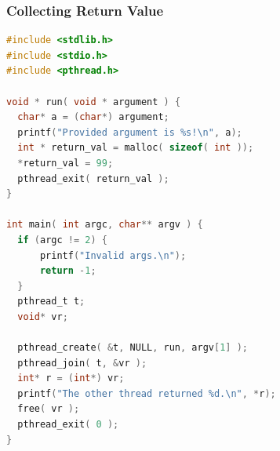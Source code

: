 \begin{frame}[fragile]
	\frametitle{Collecting Return Value}

	\begin{lstlisting}[language=C]
#include <stdlib.h>
#include <stdio.h>
#include <pthread.h>

void * run( void * argument ) { 
  char* a = (char*) argument;
  printf("Provided argument is %s!\n", a); 
  int * return_val = malloc( sizeof( int )); 
  *return_val = 99; 
  pthread_exit( return_val );
}

int main( int argc, char** argv ) { 
  if (argc != 2) {
      printf("Invalid args.\n");
      return -1; 
  }
  pthread_t t;
  void* vr; 
  
  pthread_create( &t, NULL, run, argv[1] );
  pthread_join( t, &vr );
  int* r = (int*) vr; 
  printf("The other thread returned %d.\n", *r);
  free( vr );
  pthread_exit( 0 );
}
\end{lstlisting}


\end{frame}






